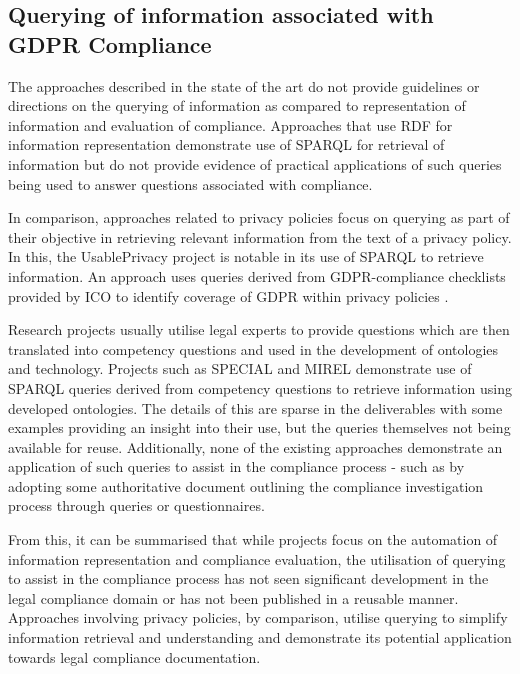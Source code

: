 \subsection{Querying of information associated with GDPR Compliance}
The approaches described in the state of the art do not provide guidelines or directions on the querying of information as compared to representation of information and evaluation of compliance. Approaches that use RDF for information representation demonstrate use of SPARQL for retrieval of information but do not provide evidence of practical applications of such queries being used to answer questions associated with compliance.

In comparison, approaches related to privacy policies focus on querying as part of their objective in retrieving relevant information from the text of a privacy policy. In this, the UsablePrivacy project is notable in its use of SPARQL to retrieve information. An approach uses queries derived from GDPR-compliance checklists provided by ICO to identify coverage of GDPR within privacy policies \cite{linden_privacy_2018}.

Research projects usually utilise legal experts to provide questions which are then translated into competency questions and used in the development of ontologies and technology. Projects such as SPECIAL and MIREL demonstrate use of SPARQL queries derived from competency questions to retrieve information using developed ontologies. The details of this are sparse in the deliverables with some examples providing an insight into their use, but the queries themselves not being available for reuse. Additionally, none of the existing approaches demonstrate an application of such queries to assist in the compliance process - such as by adopting some authoritative document outlining the compliance investigation process through queries or questionnaires.

From this, it can be summarised that while projects focus on the automation of information representation and compliance evaluation, the utilisation of querying to assist in the compliance process has not seen significant development in the legal compliance domain or has not been published in a reusable manner. Approaches involving privacy policies, by comparison, utilise querying to simplify information retrieval and understanding and demonstrate its potential application towards legal compliance documentation.

